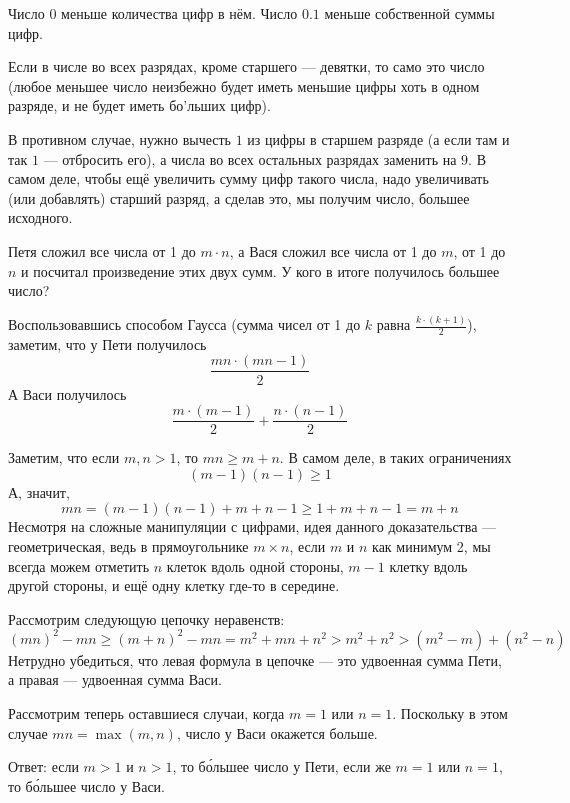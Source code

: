 \begin{itemize}
\itA Число $0$ меньше количества цифр в нём. Число $0.1$ меньше собственной суммы цифр.

\itB Если в числе во всех разрядах, кроме старшего --- девятки, то само это число 
(любое меньшее число неизбежно будет иметь меньшие цифры хоть в одном 
разряде, и не будет иметь бо'льших цифр).

В противном случае, нужно вычесть $1$ из цифры в старшем разряде (а если там и так
$1$ --- отбросить его), а числа во всех остальных разрядах заменить на $9$. 
В самом деле, чтобы ещё увеличить сумму цифр такого числа, надо увеличивать (или добавлять)
старший разряд, а сделав это, мы получим число, большее исходного.

\itC Петя сложил все числа от 1 до $m \cdot n$, а Вася сложил все числа от 1 до $m$, 
от 1 до $n$ и посчитал произведение этих двух сумм. У кого в итоге получилось большее число?

Воспользовавшись способом Гаусса (сумма чисел от 1 до $k$ равна $\frac{k\cdot(k+1)}{2}$),
заметим, что у Пети получилось $$\frac{mn \cdot (mn-1)}{2}$$
А Васи получилось
$$\frac{m \cdot (m-1)}{2} + \frac{n \cdot (n-1)}{2}$$

Заметим, что если $m,n > 1$, то $mn \ge m+n$.
В самом деле, в таких ограничениях $$(m-1)(n-1) \ge 1$$ 
А, значит, $$mn = (m-1)(n-1) + m + n - 1 \ge 1 + m + n - 1 = m + n$$
Несмотря на сложные манипуляции с цифрами, идея данного доказательства --- геометрическая,
ведь в прямоугольнике $m \times n$, если $m$ и $n$ как минимум 2, мы всегда 
можем отметить $n$ клеток вдоль одной стороны,
$m-1$ клетку вдоль другой стороны, и ещё одну клетку где-то в середине.
\begin{center}%
\end{center}


Рассмотрим следующую цепочку неравенств: 
$$(mn)^2 - mn \ge (m+n)^2 - mn = m^2 + mn + n^2 > m^2 + n^2 > (m^2 - m) + (n^2 - n)$$
Нетрудно убедиться, что левая формула в цепочке --- это удвоенная сумма Пети, а правая --- удвоенная сумма Васи.

Рассмотрим теперь оставшиеся случаи, когда $m=1$ или $n=1$. Поскольку в этом случае
$mn = \max(m,n)$, число у Васи окажется больше.

Ответ: если $m>1$ и $n>1$, то б\'ольшее число у Пети, если же $m=1$ или $n=1$, то 
б\'ольшее число у Васи.

\end{itemize}
